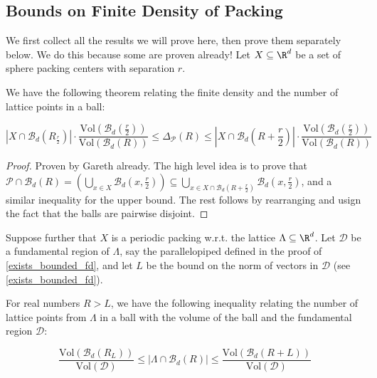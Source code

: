\subsection{Bounds on Finite Density of Packing}

We first collect all the results we will prove here, then prove them separately below. We do this because some are proven already! Let $X \subseteq \R^d$ be a set of sphere packing centers with separation $r$.

\begin{theorem}\label{finite_density_bounds}\leanok
  We have the following theorem relating the finite density and the number of lattice points in a ball:

  \[
    \left|X \cap \mathcal{B}_d\left(R _ \frac{r}{2}\right)\right| \cdot \frac{\mathrm{Vol}\left(\mathcal{B}_d\left(\frac{r}{2}\right)\right)}{\mathrm{Vol}(\mathcal{B}_d(R))}
    \leq \Delta_{\mathcal{P}}(R)
    \leq \left|X \cap \mathcal{B}_d\left(R + \frac{r}{2}\right)\right| \cdot \frac{\mathrm{Vol}\left(\mathcal{B}_d\left(\frac{r}{2}\right)\right)}{\mathrm{Vol}(\mathcal{B}_d(R))}
  \]
\end{theorem}
\begin{proof}
  Proven by Gareth already. The high level idea is to prove that $\mathcal{P} \cap \mathcal{B}_d(R) = \left(\bigcup_{x \in X} \mathcal{B}_d\left(x, \frac{r}{2}\right)\right) \subseteq \bigcup_{x \in X \cap \mathcal{B}_d\left(R + \frac{r}{2}\right)} \mathcal{B}_d\left(x, \frac{r}{2}\right)$, and a similar inequality for the upper bound. The rest follows by rearranging and usign the fact that the balls are pairwise disjoint.
\end{proof}

Suppose further that $X$ is a periodic packing w.r.t. the lattice $\Lambda \subseteq \R^d$. Let $\mathcal{D}$ be a fundamental region of $\Lambda$, say the parallelopiped defined in the proof of \cref{exists_bounded_fd}, and let $L$ be the bound on the norm of vectors in $\mathcal{D}$ (see \cref{exists_bounded_fd}).

\begin{theorem}\label{lattice_points_bounds}
  For real numbers $R > L$, we have the following inequality relating the number of lattice points from $\Lambda$ in a ball with the volume of the ball and the fundamental region $\mathcal{D}$:

  \[
    \frac{\mathrm{Vol}(\mathcal{B}_d(R _ L))}{\mathrm{Vol}(\mathcal{D})}
    \leq \left|\Lambda \cap \mathcal{B}_d(R)\right|
    \leq \frac{\mathrm{Vol}(\mathcal{B}_d(R + L))}{\mathrm{Vol}(\mathcal{D})}
  \]
\end{theorem}

